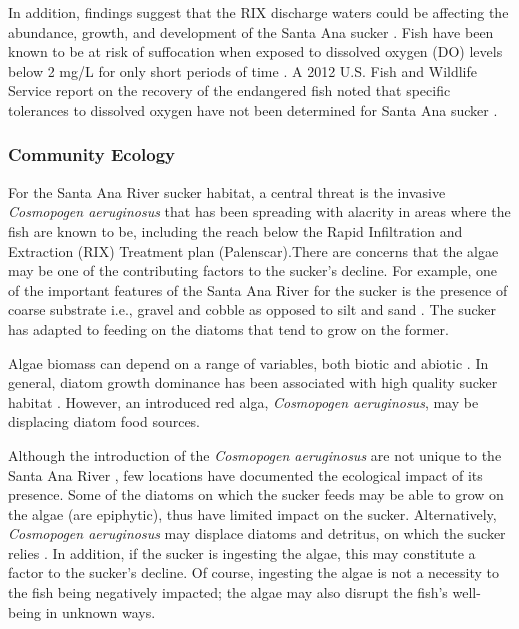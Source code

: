 \documentclass{article}\usepackage[]{graphicx}\usepackage[]{color}
\begin{document}
In addition, findings suggest that the RIX discharge waters could be affecting the abundance, growth, and development of the Santa Ana sucker \citep{jenkins2009effects}. Fish have been known to be at risk of suffocation when exposed to dissolved oxygen (DO) levels below 2 mg/L for only short periods of time \citep{REF}. A 2012 U.S. Fish and Wildlife Service report on the recovery of the endangered fish noted that specific tolerances to dissolved oxygen have not been determined for  Santa Ana sucker \citep{evans2005draft}.

\subsubsection{Community Ecology}

For the Santa Ana River sucker habitat, a central threat is the invasive \emph{Cosmopogen aeruginosus} that has been spreading with alacrity in areas where the fish are known to be, including the reach below the Rapid Infiltration and Extraction (RIX) Treatment plan (Palenscar)\citep{palenscar}.There are concerns that the algae may be one of the contributing factors to the sucker's decline. For example, one of the important features of the Santa Ana River for the sucker is the presence of coarse substrate i.e., gravel and cobble as opposed to silt and sand \citep{thompson2010influence}. The sucker has adapted to feeding on the diatoms that tend to grow on the former. 

Algae biomass can depend on a range of variables, both biotic and abiotic \citep{winkelmann2014top}. In general, diatom growth dominance has been associated with high quality sucker habitat \citep{REF}. However, an introduced red alga, \emph{Cosmopogen aeruginosus}, may be displacing diatom food sources. 

Although the introduction of the \emph{Cosmopogen aeruginosus} are not unique to the Santa Ana River \citep{vzakova2013new}, few locations have documented the ecological impact of its presence. Some of the diatoms on which the sucker feeds may be able to grow on the algae (are epiphytic), thus have limited impact on the sucker. Alternatively, \emph{Cosmopogen aeruginosus} may displace diatoms and detritus, on which the sucker relies \citep{thompson2010influence}. In addition, if the sucker is ingesting the algae, this may constitute a factor to the sucker's decline. Of course, ingesting the algae is not a necessity to the fish being negatively impacted; the algae may also disrupt the fish's well-being in unknown ways. 
\end{document}
